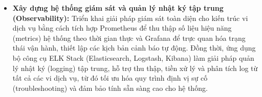 \begin{itemize}
\item \textbf{Xây dựng hệ thống giám sát và quản lý nhật ký tập trung (Observability):}
Triển khai giải pháp giám sát toàn diện cho kiến trúc vi dịch vụ
bằng cách tích hợp Prometheus để thu thập số liệu hiệu năng (metrics)
hệ thống theo thời gian thực
và Grafana để trực quan hóa trạng thái vận hành, thiết lập các kịch bản cảnh báo tự động.
Đồng thời, ứng dụng bộ công cụ ELK Stack
(Elasticsearch, Logstash, Kibana)
làm giải pháp quản lý nhật ký (logging) tập trung,
hỗ trợ thu thập, tiền xử lý và phân tích log
từ tất cả các vi dịch vụ, từ đó tối ưu hóa quy trình
định vị sự cố (troubleshooting) và đảm bảo tính sẵn sàng cao cho hệ thống.

\end{itemize}
\newpage
